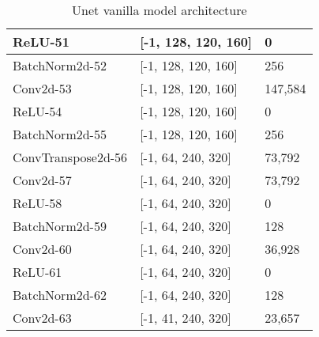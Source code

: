     \begin{table}[]
    	\begin{center}
    		\begin{tabular}{| l | l | p{3cm} |}
    			\hline
    			ReLU-51            & {[}-1, 128, 120, 160{]} & 0         \\ \hline
    			BatchNorm2d-52     & {[}-1, 128, 120, 160{]} & 256       \\ \hline
    			Conv2d-53          & {[}-1, 128, 120, 160{]} & 147,584   \\ \hline
    			ReLU-54            & {[}-1, 128, 120, 160{]} & 0         \\ \hline
    			BatchNorm2d-55     & {[}-1, 128, 120, 160{]} & 256       \\ \hline
    			ConvTranspose2d-56 & {[}-1, 64, 240, 320{]}  & 73,792    \\ \hline
    			Conv2d-57          & {[}-1, 64, 240, 320{]}  & 73,792    \\ \hline
    			ReLU-58            & {[}-1, 64, 240, 320{]}  & 0         \\ \hline
    			BatchNorm2d-59     & {[}-1, 64, 240, 320{]}  & 128       \\ \hline
    			Conv2d-60          & {[}-1, 64, 240, 320{]}  & 36,928    \\ \hline
    			ReLU-61            & {[}-1, 64, 240, 320{]}  & 0         \\ \hline
    			BatchNorm2d-62     & {[}-1, 64, 240, 320{]}  & 128       \\ \hline
    			Conv2d-63          & {[}-1, 41, 240, 320{]}  & 23,657    \\ \hline
    		\end{tabular}
    		\caption{Unet vanilla model architecture}
    		\label{table:unet_vanilla_model_2}
    	\end{center}
    \end{table}

